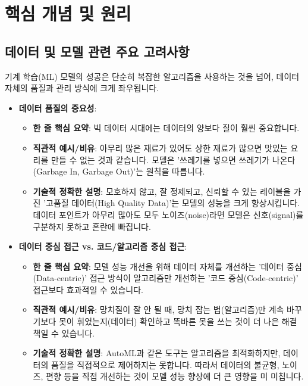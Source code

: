 \documentclass[11pt,a4paper]{article}
\theoremstyle{definition}
\begin{document}
\newpage
\section*{핵심 개념 및 원리}

\subsection*{데이터 및 모델 관련 주요 고려사항}

기계 학습(ML) 모델의 성공은 단순히 복잡한 알고리즘을 사용하는 것을 넘어, 데이터 자체의 품질과 관리 방식에 크게 좌우됩니다.

\begin{itemize}
    \item \textbf{데이터 품질의 중요성}:
    \begin{itemize}
        \item \textbf{한 줄 핵심 요약}: 빅 데이터 시대에는 데이터의 양보다 질이 훨씬 중요합니다.
        \item \textbf{직관적 예시/비유}: 아무리 많은 재료가 있어도 상한 재료가 많으면 맛있는 요리를 만들 수 없는 것과 같습니다. 모델은 '쓰레기를 넣으면 쓰레기가 나온다(Garbage In, Garbage Out)'는 원칙을 따릅니다.
        \item \textbf{기술적 정확한 설명}: 모호하지 않고, 잘 정제되고, 신뢰할 수 있는 레이블을 가진 '고품질 데이터(High Quality Data)'는 모델의 성능을 크게 향상시킵니다. 데이터 포인트가 아무리 많아도 모두 노이즈(noise)라면 모델은 신호(signal)를 구분하지 못하고 혼란에 빠집니다.
    \end{itemize}

    \item \textbf{데이터 중심 접근 vs. 코드/알고리즘 중심 접근}:
    \begin{itemize}
        \item \textbf{한 줄 핵심 요약}: 모델 성능 개선을 위해 데이터 자체를 개선하는 '데이터 중심(Data-centric)' 접근 방식이 알고리즘만 개선하는 '코드 중심(Code-centric)' 접근보다 효과적일 수 있습니다.
        \item \textbf{직관적 예시/비유}: 망치질이 잘 안 될 때, 망치 잡는 법(알고리즘)만 계속 바꾸기보다 못이 휘었는지(데이터) 확인하고 똑바른 못을 쓰는 것이 더 나은 해결책일 수 있습니다.
        \item \textbf{기술적 정확한 설명}: AutoML과 같은 도구는 알고리즘을 최적화하지만, 데이터의 품질을 직접적으로 제어하지는 못합니다. 따라서 데이터의 불균형, 노이즈, 편향 등을 직접 개선하는 것이 모델 성능 향상에 더 큰 영향을 미 미칩니다.
    \end{itemize}


\end{itemize}
\end{document}
